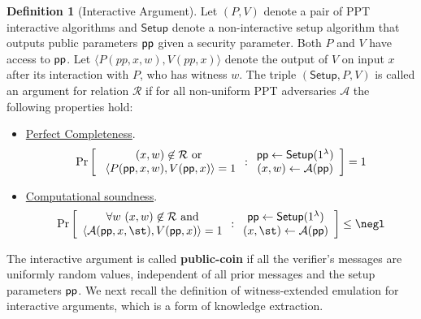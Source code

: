 \documentclass{article}
\theoremstyle{definition}
\newtheorem{definition}{Definition}
\begin{document}
\begin{definition} [Interactive Argument]\label{def:argument}
Let $(P, V)$ denote a pair of PPT interactive algorithms and $\textsf{Setup}$ denote a non-interactive setup algorithm that outputs public parameters $\textsf{pp}$ given a security parameter. Both $P$ and $V$ have access to $\textsf{pp}$. Let $\langle P(pp, x, w), V(pp, x) \rangle$ denote the output of $V$ on input $x$ after its interaction with $P$, who has witness $w$. The triple $(\textsf{Setup}, P, V)$ is called an argument for relation $\mathcal{R}$ if for all non-uniform PPT adversaries $\mathcal{A}$ the following properties hold: 

\begin{itemize}
\item \underline{Perfect Completeness}. 
\[
\Pr \left[
\begin{array}{c}
        (x, w) \not \in  \mathcal{R} \ \text{or} \\
         \ \langle P(\textsf{pp}, x, w), V(\textsf{pp}, x) \rangle = 1 \\
\end{array}
:
\begin{array}{c}
             \textsf{pp} \leftarrow \textsf{Setup}(1^\lambda) \\
             (x, w) \leftarrow \mathcal{A}(\textsf{pp}) \\
\end{array} 
\right]  = 1 
 \]

\item \underline{Computational soundness}. 
\[
\Pr \left[
\begin{array}{c}
        \forall w \ (x, w) \not\in  \mathcal{R} \ \text{and} \\ 
         \langle \mathcal{A}(\params, x, \st), V(\params, x) \rangle = 1 
\end{array}
:
\begin{array}{c}
             \params \leftarrow \textsf{Setup}(1^\lambda) \\
             (x, \st) \leftarrow \mathcal{A}(\params) \\
\end{array}
        \right] \leq \negl
\]
\end{itemize} 
\end{definition} 

The interactive argument is called \textbf{public-coin} if all the verifier's messages are uniformly random values, independent of all prior messages and the setup parameters $\textsf{pp}$. 
We next recall the definition of witness-extended emulation for interactive arguments, which is a form of knowledge extraction.  
\end{document}
